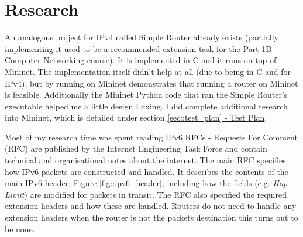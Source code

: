 \documentclass[12pt,a4paper,twoside,openany]{report}
\begin{document}
\section{Research}
An analogous project for IPv4 called Simple Router already exists\cite{simple_router} (partially implementing it used to be a recommended extension task for the Part 1B Computer Networking course).  It is implemented in C and it runs on top of Mininet.  The implementation itself didn't help at all (due to being in C and for IPv4), but by running on Mininet demonstrates that running a router on Mininet is feasible.  Additionally the Mininet Python code that ran the Simple Router's executable helped me a little design Luxing.  I did complete additional research into Mininet, which is detailed under section \ref{sec::test_plan}\hyperref[sec::test_plan]{ - Test Plan}.

\bigskip

Most of my research time was spent reading IPv6 RFCs - Requests For Comment (RFC) are published by the Internet Engineering Task Force and contain technical and organisational notes about the internet\cite{what_rfc}.  The main RFC\cite{ipv6_rfc} specifies how IPv6 packets are constructed and handled. It describes the contents of the main IPv6 header, \hyperref[fig::ipv6_header]{Figure }\ref{fig::ipv6_header}, including how the fields (e.g. \textit{Hop Limit}) are modified for packets in transit. The RFC also specified the required extension headers and how these are handled. Routers do not need to handle any extension headers when the router is not the packets destination this turns out to be none. 
\end{document}
